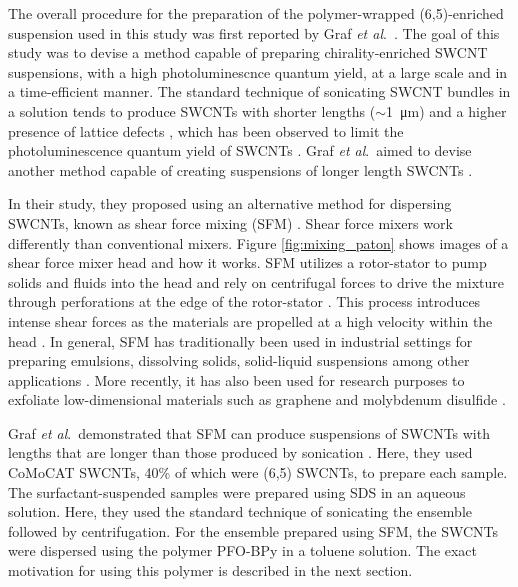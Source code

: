 The overall procedure for the preparation of the polymer-wrapped (6,5)-enriched suspension used in this study was first reported by Graf \textit{et al}.\ \cite{graf2016large}. The goal of this study was to devise a method capable of preparing chirality-enriched SWCNT suspensions, with a high photoluminescnce quantum yield, at a large scale and in a time-efficient manner. The standard technique of sonicating SWCNT bundles in a solution tends to produce SWCNTs with shorter lengths ($\sim$\SI{1}{\micro\meter}) and a higher presence of lattice defects \cite{khan2010high}, which has been observed to limit the photoluminescence quantum yield of SWCNTs \cite{mouri2012dispersion}. Graf \textit{et al}.\ aimed to devise another method capable of creating suspensions of longer length SWCNTs \cite{graf2016large}.

In their study, they proposed using an alternative method for dispersing SWCNTs, known as shear force mixing (SFM) \cite{hall2011scaling, zhang2012high}. Shear force mixers work differently than conventional mixers. Figure \ref{fig:mixing_paton} shows images of a shear force mixer head and how it works. SFM utilizes a rotor-stator to pump solids and fluids into the head and rely on centrifugal forces to drive the mixture through perforations at the edge of the rotor-stator \cite{paton2014scalable}. This process introduces intense shear forces as the materials are propelled at a high velocity within the head \cite{paton2014scalable}. In general, SFM has traditionally been used in industrial settings for preparing emulsions, dissolving solids, solid-liquid suspensions among other applications \cite{hall2011scaling, zhang2012high}. More recently, it has also been used for research purposes to exfoliate low-dimensional materials such as graphene \cite{paton2014scalable} and molybdenum disulfide \cite{varrla2015large}.



Graf \textit{et al}.\ demonstrated that SFM can produce suspensions of SWCNTs with lengths that are longer than those produced by sonication \cite{graf2016large}. Here, they used CoMoCAT SWCNTs, 40\% of which were (6,5) SWCNTs, to prepare each sample. The surfactant-suspended samples were prepared using SDS in an aqueous solution. Here, they used the standard technique of sonicating the ensemble followed by centrifugation. For the ensemble prepared using SFM, the SWCNTs were dispersed using the polymer PFO-BPy in a toluene solution. The exact motivation for using this polymer is described in the next section.


